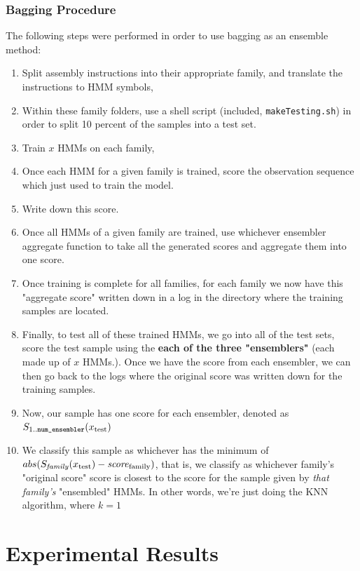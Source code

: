 \documentclass[12pt]{article}
\begin{document}
\subsubsection*{Bagging Procedure}
  The following steps were performed in order to use bagging as an ensemble method:
  \begin{enumerate}
    \item Split assembly instructions into their appropriate family, and translate the instructions to HMM symbols,
    \item Within these family folders, use a shell script (included, \texttt{makeTesting.sh}) in order to split 10 percent of the samples into a test set.
    \item Train $x$ HMMs on each family,
    \item Once each HMM for a given family is trained, score the observation sequence which just used to train the model.
    \item Write down this score. 
    \item Once all HMMs of a given family are trained, use whichever ensembler aggregate function to take all the generated scores and aggregate them into one score. 
    \item Once training is complete for all families, for each family we now have this "aggregate score" written down in a log in the directory where the training samples are located.
    \item Finally, to test all of these trained HMMs, we go into all of the test sets, score the test sample using the \textbf{each of the three "ensemblers"} (each made up of $x$ HMMs.). Once we have the score from each ensembler, we can then go back to the logs where the original score was written down for the training samples. 
    \item Now, our sample has one score for each ensembler, denoted as $S_{1..\text{\texttt{num\_ensembler}}}(x_{\text{test}})$
    \item We classify this sample as whichever has the minimum of $abs(S_{\text{\textit{family}}}(x_{\text{test}}) - \text{\textit{score}}_\text{family} )$, that is, we classify as whichever family's "original score" score is closest to the score for the sample given by \textit{that family's} "ensembled" HMMs. In other words, we're just doing the KNN algorithm, where $k = 1$
  \end{enumerate}


\newpage
\section{Experimental Results}
\end{document}
